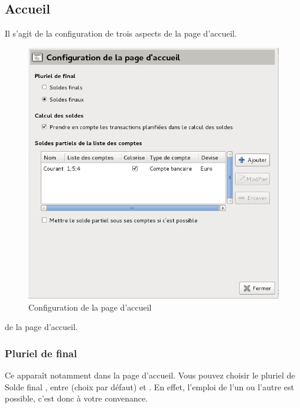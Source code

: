\subsection{Accueil\label{setup-general-home}}

Il s'agit de la configuration de trois aspects \ifIllustration de la page d'accueil.
\begin{figure}[ht]
\begin{center}
\includegraphics[scale=0.5]{image/screenshot/setup_home}
\end{center}
\caption{Configuration de la page d'accueil}
\label{setup-home-img}
\end{figure}
\else de la page d'accueil.
\fi


\subsubsection{Pluriel de final\label{setup-general-home-final}}

Ce  apparaît notamment dans la page d'accueil. Vous pouvez choisir le pluriel de \og Solde final \fg{}, entre  (choix par défaut) et . En effet, l'emploi de l'un ou l'autre est possible, c'est donc à votre convenance. 


